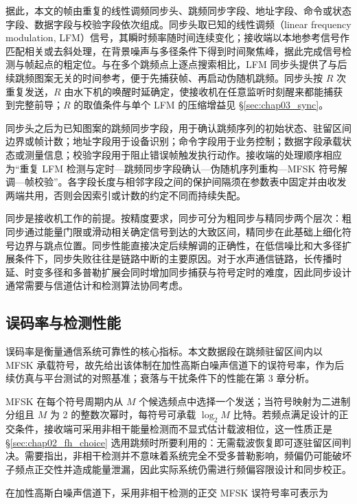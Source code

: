 据此，本文的帧由重复的线性调频同步头、跳频同步字段、地址字段、命令或状态字段、数据字段与校验字段依次组成。同步头取已知的线性调频（linear frequency modulation, LFM）信号，其瞬时频率随时间连续变化；接收端以本地参考信号作匹配相关或去斜处理，在背景噪声与多径条件下得到时间聚焦峰，据此完成信号检测与帧起点的粗定位。与在多个跳频点上逐点搜索相比，LFM 同步头提供了与后续跳频图案无关的时间参考，便于先捕获帧、再启动伪随机跳频。同步头按 $R$ 次重复发送，$R$ 由水下机的唤醒时延确定，使接收机在任意监听时刻醒来都能捕获到完整前导；$R$ 的取值条件与单个 LFM 的压缩增益见 \S\ref{sec:chap03_sync}。

同步头之后为已知图案的跳频同步字段，用于确认跳频序列的初始状态、驻留区间边界或帧计数；地址字段用于设备识别；命令字段用于业务控制；数据字段承载状态或测量信息；校验字段用于阻止错误帧触发执行动作。接收端的处理顺序相应为“重复 LFM 检测与定时—跳频同步字段确认—伪随机序列重构—MFSK 符号解调—帧校验”。各字段长度与相邻字段之间的保护间隔须在参数表中固定并由收发两端共用，否则会因索引或计数的约定不同而持续失配。

同步是接收机工作的前提。按精度要求，同步可分为粗同步与精同步两个层次：粗同步通过能量门限或滑动相关确定信号到达的大致区间，精同步在此基础上细化符号边界与跳点位置。同步性能直接决定后续解调的正确性，在低信噪比和大多径扩展条件下，同步失败往往是链路中断的主要原因。对于水声通信链路，长传播时延、时变多径和多普勒扩展会同时增加同步捕获与符号定时的难度，因此同步设计通常需要与信道估计和检测算法协同考虑\cite{kilfoyleStateArtUnderwater2000,vanWalreePropagationScatteringEffects2013}。

\subsection{误码率与检测性能}
\label{sec:chap02_ber}

误码率是衡量通信系统可靠性的核心指标。本文数据段在跳频驻留区间内以 MFSK 承载符号，故先给出该体制在加性高斯白噪声信道下的误符号率，作为后续仿真与平台测试的对照基准；衰落与干扰条件下的性能在第 3 章分析。

MFSK 在每个符号周期内从 $M$ 个候选频点中选择一个发送；当符号映射为二进制分组且 $M$ 为 2 的整数次幂时，每符号可承载 $\log_2 M$ 比特。若频点满足设计的正交条件，接收端可采用非相干能量检测而不显式估计载波相位，这一性质正是 \S\ref{sec:chap02_fh_choice} 选用跳频时所要利用的：无需载波恢复即可逐驻留区间判决。需要指出，非相干检测并不意味着系统完全不受多普勒影响，频偏仍可能破坏子频点正交性并造成能量泄漏，因此实际系统仍需进行频偏容限设计和同步校正。

在加性高斯白噪声信道下，采用非相干检测的正交 MFSK 误符号率可表示为

